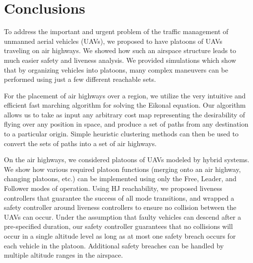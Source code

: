 \section{Conclusions}
To address the important and urgent problem of the traffic management of unmanned aerial vehicles (UAVs), we proposed to have platoons of UAVs traveling on air highways. We showed how such an airspace structure leads to much easier safety and liveness analysis. We provided simulations which show that by organizing vehicles into platoons, many complex maneuvers can be performed using just a few different reachable sets.

For the placement of air highways over a region, we utilize the very intuitive and efficient fast marching algorithm for solving the Eikonal equation. Our algorithm allows us to take as input any arbitrary cost map representing the desirability of flying over any position in space, and produce a set of paths from any destination to a particular origin. Simple heuristic clustering methods can then be used to convert the sets of paths into a set of air highways.

On the air highways, we considered platoons of UAVs modeled by hybrid systems. We show how various required platoon functions (merging onto an air highway, changing platoons, etc.) can be implemented using only the Free, Leader, and Follower modes of operation. Using HJ reachability, we proposed liveness controllers that guarantee the success of all mode transitions, and wrapped a safety controller around liveness controllers to ensure no collision between the UAVs can occur. Under the assumption that faulty vehicles can descend after a pre-specified duration, our safety controller guarantees that no collisions will occur in a single altitude level as long as at most one safety breach occurs for each vehicle in the platoon. Additional safety breaches can be handled by multiple altitude ranges in the airspace. 

